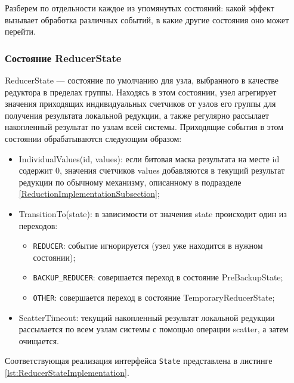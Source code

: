 Разберем по отдельности каждое из упомянутых состояний: какой эффект вызывает обработка различных событий, в какие другие состояния оно может перейти.

\subsubsection{Состояние ReducerState}

ReducerState --- состояние по умолчанию для узла, выбранного в качестве редуктора в пределах группы. Находясь в этом состоянии, узел агрегирует значения приходящих индивидуальных счетчиков от узлов его группы для получения результата локальной редукции, а также регулярно рассылает накопленный результат по узлам всей системы. Приходящие события в этом состоянии обрабатываются следующим образом:

\begin{itemize}
    \item IndividualValues(id, values): если битовая маска результата на месте id содержит $0$, значения счетчиков values добавляются в текущий результат редукции по обычному механизму, описанному в подразделе \ref{ReductionImplementationSubsection};
    
    \item TransitionTo(state): в зависимости от значения state происходит один из переходов:
        
        \begin{itemize}
            \item \texttt{REDUCER}: событие игнорируется (узел уже находится в нужном состоянии);
            \item \texttt{BACKUP\_REDUCER}: совершается переход в состояние PreBackupState;
            \item \texttt{OTHER}: совершается переход в состояние TemporaryReducerState;
        \end{itemize}
        
    \item ScatterTimeout: текущий накопленный результат локальной редукции рассылается по всем узлам системы с помощью операции scatter, а затем очищается.
\end{itemize}

Соответствующая реализация интерфейса \texttt{State} представлена в листинге \ref{lst:ReducerStateImplementation}.

